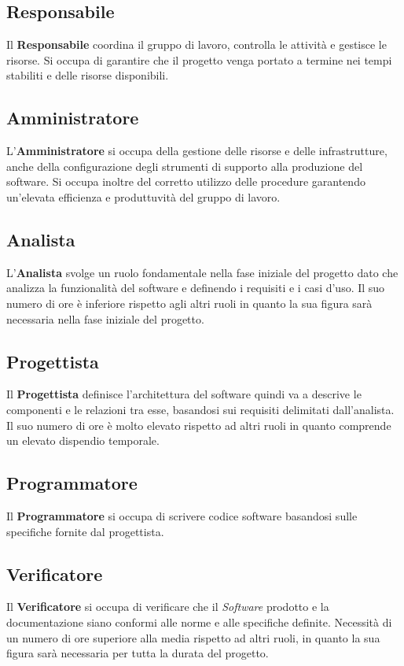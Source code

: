 \documentclass{article}
\begin{document}
\subsection{Responsabile}
Il \textbf{Responsabile} coordina il gruppo di lavoro, controlla le attività e gestisce le risorse. Si occupa di garantire che il progetto venga portato a termine nei tempi stabiliti e delle risorse disponibili.
\subsection{Amministratore}
L'\textbf{Amministratore} si occupa della gestione delle risorse e delle infrastrutture, anche della configurazione degli strumenti di supporto alla produzione del software.
Si occupa inoltre del corretto utilizzo delle procedure garantendo un'elevata efficienza e produttuvità del gruppo di lavoro.
\subsection{Analista}
L'\textbf{Analista} svolge un ruolo fondamentale nella fase iniziale del progetto dato che analizza la funzionalità del software e definendo i requisiti e i casi d'uso. Il suo numero di ore è inferiore rispetto agli altri ruoli in quanto la sua figura sarà necessaria nella fase iniziale del progetto.
\subsection{Progettista}
Il \textbf{Progettista} definisce l'architettura del software quindi va a descrive le componenti e le relazioni tra esse, basandosi sui requisiti delimitati dall'analista. Il suo numero di ore è molto elevato rispetto ad altri ruoli in quanto comprende un elevato dispendio temporale.
\subsection{Programmatore}
Il \textbf{Programmatore} si occupa di scrivere codice software basandosi sulle specifiche fornite dal progettista.
\subsection{Verificatore}
Il \textbf{Verificatore} si occupa di verificare che il \textit{Software} prodotto e la documentazione siano conformi alle norme e alle specifiche definite. Necessità di un numero di ore superiore alla media rispetto ad altri ruoli, in quanto la sua figura sarà necessaria per tutta la durata del progetto.
\newpage
\end{document}
